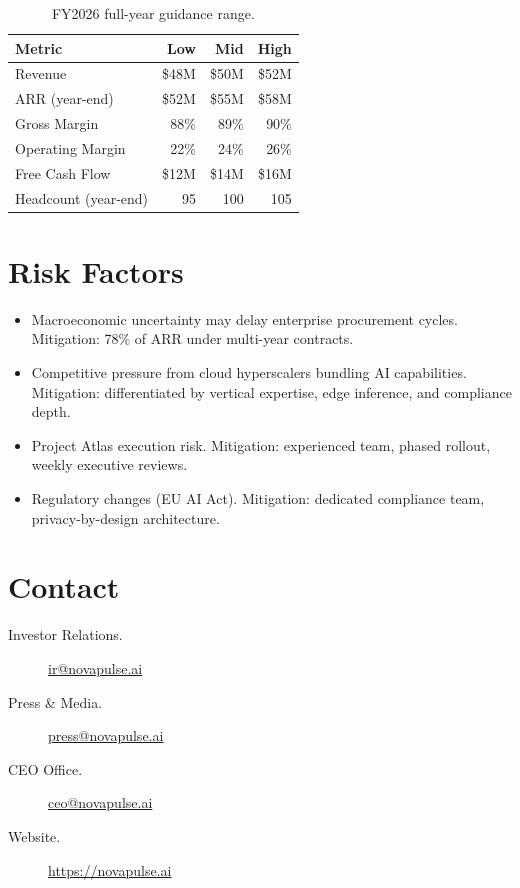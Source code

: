 \documentclass[
    language=english,
    doctype=stakeholder-report,
    institution=none,
]{../../omnilatex}
\begin{document}
\begin{table}[h]
    \centering
    \begin{tabular}{lrrr}
        \toprule
        \textbf{Metric} & \textbf{Low} & \textbf{Mid} & \textbf{High} \\
        \midrule
        Revenue            & \$48M  & \$50M  & \$52M  \\
        ARR (year-end)     & \$52M  & \$55M  & \$58M  \\
        Gross Margin       & 88\%   & 89\%   & 90\%   \\
        Operating Margin   & 22\%   & 24\%   & 26\%   \\
        Free Cash Flow     & \$12M  & \$14M  & \$16M  \\
        Headcount (year-end) & 95   & 100    & 105    \\
        \bottomrule
    \end{tabular}
    \caption{FY2026 full-year guidance range.}
\end{table}

\section{Risk Factors}

\begin{itemize}
    \item Macroeconomic uncertainty may delay enterprise procurement cycles.
        Mitigation: 78\% of ARR under multi-year contracts.
    \item Competitive pressure from cloud hyperscalers bundling AI capabilities.
        Mitigation: differentiated by vertical expertise, edge inference, and
        compliance depth.
    \item Project Atlas execution risk. Mitigation: experienced team,
        phased rollout, weekly executive reviews.
    \item Regulatory changes (EU AI Act). Mitigation: dedicated compliance
        team, privacy-by-design architecture.
\end{itemize}

\section{Contact}

\begin{description}
    \item[Investor Relations.] \href{mailto:ir@novapulse.ai}{ir@novapulse.ai}
    \item[Press \& Media.] \href{mailto:press@novapulse.ai}{press@novapulse.ai}
    \item[CEO Office.] \href{mailto:ceo@novapulse.ai}{ceo@novapulse.ai}
    \item[Website.] \url{https://novapulse.ai}
\end{description}

\printbibliography[heading=none]
\end{document}
